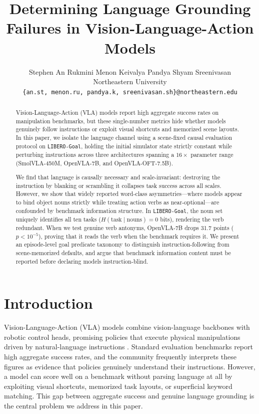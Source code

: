 \documentclass[11pt]{article}
\title{Determining Language Grounding Failures in Vision-Language-Action Models}
\author{Stephen An \quad Rukmini Menon \quad Keivalya Pandya \quad Shyam Sreenivasan \\
  Northeastern University \\
  \texttt{\{an.st, menon.ru, pandya.k, sreenivasan.sh\}@northeastern.edu}}
\begin{document}
\maketitle

\begin{abstract}
Vision-Language-Action (VLA) models report high aggregate success rates on manipulation benchmarks, but these single-number metrics hide whether models genuinely follow instructions or exploit visual shortcuts and memorized scene layouts. In this paper, we isolate the language channel using a scene-fixed causal evaluation protocol on \texttt{LIBERO-Goal}, holding the initial simulator state strictly constant while perturbing instructions across three architectures spanning a $16\times$ parameter range (SmolVLA-450M, OpenVLA-7B, and OpenVLA-OFT-7.5B).

We find that language is causally necessary and scale-invariant: destroying the instruction by blanking or scrambling it collapses task success across all scales. However, we show that widely reported word-class asymmetries---where models appear to bind object nouns strictly while treating action verbs as near-optional---are confounded by benchmark information structure. In \texttt{LIBERO-Goal}, the noun set uniquely identifies all ten tasks ($H(\text{task}\mid\text{nouns})=0$ bits), rendering the verb redundant. When we test genuine verb antonyms, OpenVLA-7B drops 31.7 points ($p < 10^{-5}$), proving that it reads the verb when the benchmark requires it. We present an episode-level goal predicate taxonomy to distinguish instruction-following from scene-memorized defaults, and argue that benchmark information content must be reported before declaring models instruction-blind.
\end{abstract}

\section{Introduction}
Vision-Language-Action (VLA) models combine vision-language backbones with robotic control heads, promising policies that execute physical manipulations driven by natural-language instructions \citep{brohan2022rt1,brohan2023rt2,driess2023palm,kim2025openvla,shukor2025smolvla}. Standard evaluation benchmarks report high aggregate success rates, and the community frequently interprets these figures as evidence that policies genuinely understand their instructions. However, a model can score well on a benchmark without parsing language at all by exploiting visual shortcuts, memorized task layouts, or superficial keyword matching. This gap between aggregate success and genuine language grounding is the central problem we address in this paper.
\end{document}
